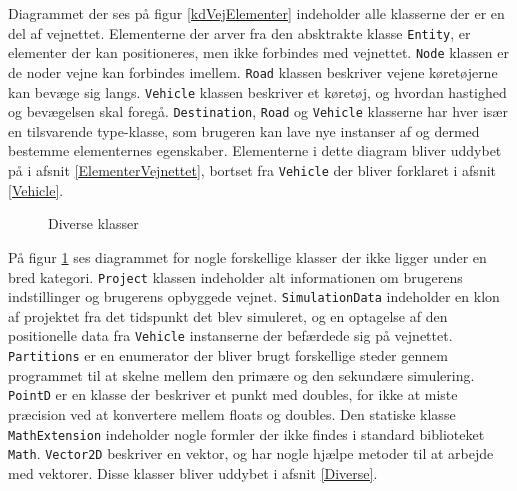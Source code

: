 Diagrammet der ses på figur \ref{kdVejElementer} indeholder alle klasserne der er en del af vejnettet. Elementerne der arver fra den absktrakte klasse \texttt{Entity}, er elementer der kan positioneres, men ikke forbindes med vejnettet. \texttt{Node} klassen er de noder vejne kan forbindes imellem. \texttt{Road} klassen beskriver vejene køretøjerne kan bevæge sig langs. \texttt{Vehicle} klassen beskriver et køretøj, og hvordan hastighed og bevægelsen skal foregå. \texttt{Destination}, \texttt{Road} og \texttt{Vehicle} klasserne har hver især en tilsvarende type-klasse, som brugeren kan lave nye instanser af og dermed bestemme elementernes egenskaber. Elementerne i dette diagram bliver uddybet på i afsnit \ref{ElementerVejnettet}, bortset fra \texttt{Vehicle} der bliver forklaret i afsnit \ref{Vehicle}.

\begin{figure}[H]
    \centering
    \caption{Diverse klasser}
    \label{kdDiverse}
\end{figure}

På figur \ref{kdDiverse} ses diagrammet for nogle forskellige klasser der ikke ligger under en bred kategori. \texttt{Project} klassen indeholder alt informationen om brugerens indstillinger og brugerens opbyggede vejnet. \texttt{SimulationData} indeholder en klon af projektet fra det tidspunkt det blev simuleret, og en optagelse af den positionelle data fra \texttt{Vehicle} instanserne der befærdede sig på vejnettet. \texttt{Partitions} er en enumerator der bliver brugt forskellige steder gennem programmet til at skelne mellem den primære og den sekundære simulering. \texttt{PointD} er en klasse der beskriver et punkt med doubles, for ikke at miste præcision ved at konvertere mellem floats og doubles. Den statiske klasse \texttt{MathExtension} indeholder nogle formler der ikke findes i standard biblioteket \texttt{Math}. \texttt{Vector2D} beskriver en vektor, og har nogle hjælpe metoder til at arbejde med vektorer. Disse klasser bliver uddybet i afsnit \ref{Diverse}.

